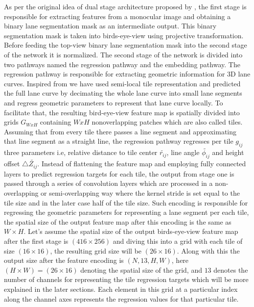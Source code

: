      As per the original idea of dual stage architecture proposed by \cite{guo2020gen}, the first stage is responsible for extracting features from a monocular image and obtaining a binary lane segmentation mask as an intermediate output. This binary segmentation mask is taken into birds-eye-view using projective transformation. Before feeding the top-view binary lane segmentation mask into the second stage of the network it is normalized. The second stage of the network is divided into two pathways named the regression pathway and the embedding pathway. The regression pathway is responsible for extracting geometric information for 3D lane curves. Inspired from \cite{DBLP:journals/corr/abs-2011-01535} we have used semi-local tile representation and predicted the full lane curve by decimating the whole lane curve into small lane segments and regress geometric parameters to represent that lane curve locally. To facilitate that, the resulting bird-eye-view \cite{DBLP:journals/corr/abs-2011-01535} feature map is spatially divided into grids $G_{WxH}$ containing $WxH$ nonoverlapping patches which are also called tiles. Assuming that from every tile there passes a line segment and approximating that line segment as a straight line, the regression pathway \cite{DBLP:journals/corr/abs-2011-01535}regresses per tile $g_{ij}$ three parameters i.e, relative distance to tile center $\widetilde{r_{ij}}$, line angle $\widetilde{\phi_{ij}}$ and height offset $\triangle \widetilde{Z_{ij}}$. Instead of flattening the feature map and employing fully connected layers to predict regression targets for each tile, the output from stage one is passed through a series of convolution layers which are processed in a non-overlapping or semi-overlapping way where the kernel stride is set equal to the tile size and in the later case half of the tile size. Such encoding is responsible for regressing the geometric parameters for representing a lane segment per each tile, the spatial size of the output feature map after this encoding is the same as $W \times H$. Let's assume the spatial size of the output birds-eye-view feature map after the first stage is $(416 \times 256)$ and diving this into a grid with each tile of size $(16 \times 16)$, the resulting grid size will be $(26 \times 16)$. Along with this the output size after the feature encoding is $(N, 13, H, W)$, here $(H \times W) = (26 \times 16)$ denoting the spatial size of the grid, and $13$ denotes the number of channels for representing the tile regression targets which will be more explained in the later sections. Each element in this grid at a particular index along the channel axes represents the regression values for that particular tile.
     
